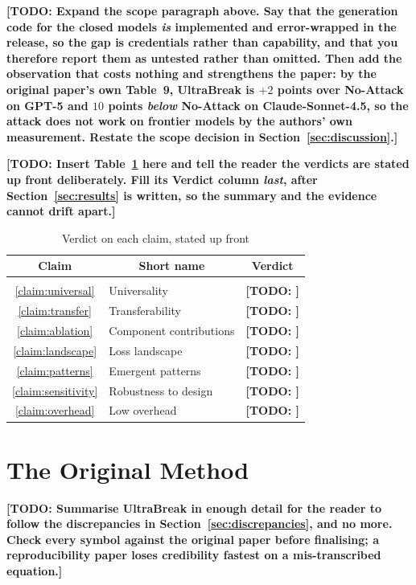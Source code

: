 \documentclass[10pt]{article} %
\newcommand{\todo}[1]{\textbf{[TODO: #1]}}
\begin{document}
\todo{Expand the scope paragraph above. Say that the generation code for the closed models \emph{is}
implemented and error-wrapped in the release, so the gap is credentials rather than capability, and
that you therefore report them as untested rather than omitted. Then add the observation that costs
nothing and strengthens the paper: by the original paper's own Table~9, UltraBreak is $+2$ points over
No-Attack on GPT-5 and $10$ points \emph{below} No-Attack on Claude-Sonnet-4.5, so the attack does not
work on frontier models by the authors' own measurement. Restate the scope decision in
Section~\ref{sec:discussion}.}

\todo{Insert Table~\ref{tab:verdicts} here and tell the reader the verdicts are stated up front
deliberately. Fill its Verdict column \emph{last}, after Section~\ref{sec:results} is written, so the
summary and the evidence cannot drift apart.}

\begin{table}[t]
\caption{Verdict on each claim, stated up front}
\label{tab:verdicts}
\begin{center}
\begin{tabular}{clp{7.2cm}}
\multicolumn{1}{c}{\bf Claim} & \multicolumn{1}{c}{\bf Short name} & \multicolumn{1}{c}{\bf Verdict}
\\ \hline \\
\ref{claim:universal}   & Universality              & \todo{} \\
\ref{claim:transfer}    & Transferability           & \todo{} \\
\ref{claim:ablation}    & Component contributions   & \todo{} \\
\ref{claim:landscape}   & Loss landscape            & \todo{} \\
\ref{claim:patterns}    & Emergent patterns         & \todo{} \\
\ref{claim:sensitivity} & Robustness to design      & \todo{} \\
\ref{claim:overhead}    & Low overhead              & \todo{} \\
\end{tabular}
\end{center}
\end{table}

\section{The Original Method}
\label{sec:method}

\todo{Summarise UltraBreak in enough detail for the reader to follow the discrepancies in Section~\ref{sec:discrepancies}, and no more. Check every symbol against the original paper before finalising; a reproducibility paper loses credibility fastest on a mis-transcribed equation.}
\end{document}

